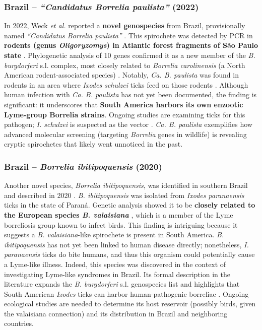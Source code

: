 \documentclass[11pt,letterpaper]{article}
\begin{document}
\subsubsection{Brazil – \textit{“Candidatus Borrelia paulista”} (2022)}
In 2022, Weck \textit{et al.} reported a \textbf{novel genospecies} from Brazil, provisionally named \textit{“Candidatus Borrelia paulista”} \citep{Weck2022}. This spirochete was detected by PCR in \textbf{rodents (genus \textit{Oligoryzomys}) in Atlantic forest fragments of São Paulo state} \citep{Weck2022a}. Phylogenetic analysis of 10 genes confirmed it as a new member of the \textit{B. burgdorferi} s.l. complex, most closely related to \textit{Borrelia carolinensis} (a North American rodent-associated species) \citep{Weck2022b, Weck2022c}. Notably, \textit{Ca. B. paulista} was found in rodents in an area where \textit{Ixodes schulzei} ticks feed on those rodents \citep{Weck2022d}. Although human infection with \textit{Ca. B. paulista} has not yet been documented, the finding is significant: it underscores that \textbf{South America harbors its own enzootic Lyme-group Borrelia strains}. Ongoing studies are examining ticks for this pathogen; \textit{I. schulzei} is suspected as the vector \citep{Weck2022e}. \textit{Ca. B. paulista} exemplifies how advanced molecular screening (targeting \textit{Borrelia} genes in wildlife) is revealing cryptic spirochetes that likely went unnoticed in the past.

\subsubsection{Brazil – \textit{Borrelia ibitipoquensis} (2020)}
Another novel species, \textit{Borrelia ibitipoquensis}, was identified in southern Brazil and described in 2020 \citep{Lucca2024e}. \textit{B. ibitipoquensis} was isolated from \textit{Ixodes paranaensis} ticks in the state of Paraná. Genetic analysis showed it to be \textbf{closely related to the European species \textit{B. valaisiana}} \citep{Lucca2024f}, which is a member of the Lyme borreliosis group known to infect birds. This finding is intriguing because it suggests a \textit{B. valaisiana}-like spirochete is present in South America. \textit{B. ibitipoquensis} has not yet been linked to human disease directly; nonetheless, \textit{I. paranaensis} ticks do bite humans, and thus this organism could potentially cause a Lyme-like illness. Indeed, this species was discovered in the context of investigating Lyme-like syndromes in Brazil. Its formal description in the literature expands the \textit{B. burgdorferi} s.l. genospecies list and highlights that South American \textit{Ixodes} ticks can harbor human-pathogenic borreliae \citep{Lucca2024g}. Ongoing ecological studies are needed to determine its host reservoir (possibly birds, given the valaisiana connection) and its distribution in Brazil and neighboring countries.
\end{document}
